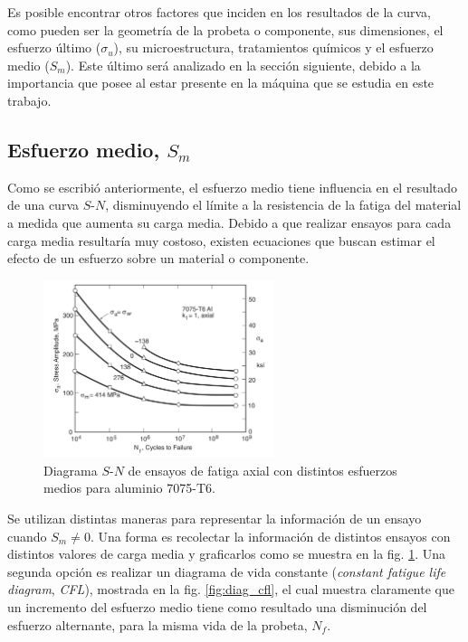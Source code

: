 Es posible encontrar otros factores que inciden en los resultados de la curva, como pueden ser la geometría de la probeta o componente, sus dimensiones, el esfuerzo último ($\sigma_{u}$), su microestructura, tratamientos químicos y el esfuerzo medio ($S_m$). Este último será analizado en la sección siguiente, debido a la importancia que posee al estar presente en la máquina que se estudia en este trabajo.

\subsection{Esfuerzo medio, $S_m$}
Como se escribió anteriormente, el esfuerzo medio tiene influencia en el resultado de una curva $S$-$N$, disminuyendo el límite a la resistencia de la fatiga del material a medida que aumenta su carga media. Debido a que realizar ensayos para cada carga media resultaría muy costoso, existen ecuaciones que buscan estimar el efecto de un esfuerzo sobre un material o componente. 

\begin{figure}[h]
\centering
\includegraphics[width=0.6\textwidth]{Imagenes/s_n_mean.pdf}
\caption{Diagrama $S$-$N$ de ensayos de fatiga axial con distintos esfuerzos medios para aluminio 7075-T6. \cite{dowling2013mechanical}}
\label{fig:s_n_mean}
\end{figure}

Se utilizan distintas maneras para representar la información de un ensayo cuando $S_m \neq 0$. Una forma es recolectar la información de distintos ensayos con distintos valores de carga media y graficarlos como se muestra en la fig. \ref{fig:s_n_mean}. Una segunda opción es realizar un diagrama de vida constante (\textit{constant fatigue life diagram}, \textit{CFL}), mostrada en la fig. \ref{fig:diag_cfl}, el cual muestra claramente que un incremento del esfuerzo medio tiene como resultado una disminución del esfuerzo alternante, para la misma vida de la probeta, $N_f$.

